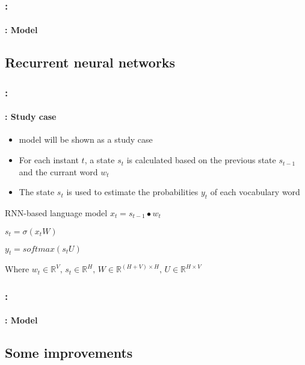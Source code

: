 \documentclass[xcolor=table]{beamer}
\begin{document}
\begin{frame}
	\frametitle{\insertshortsubtitle: \insertsection}
	\framesubtitle{\insertsubsection: Model}
	
	\vspace{-6pt}
	\begin{center}
	\end{center}

\end{frame}

\subsection{Recurrent neural networks}

\begin{frame}
	\frametitle{\insertshortsubtitle: \insertsection}
	\framesubtitle{\insertsubsection: Study case}

	\begin{itemize}
		\item \cite{2010-mokolov-al} model will be shown as a study case
		\item For each instant $t$, a state $s_t$ is calculated based on the previous state $s_{t-1}$ and the currant word $w_t$
		\item The state $s_t$ is used to estimate the probabilities $y_t$ of each vocabulary word
	\end{itemize}
	
	\begin{block}{RNN-based language model}
		$x_t = s_{t-1} \bullet w_t$
		
		$s_t = \sigma(x_t W)$
		
		$y_t = softmax(s_t U)$
		
		Where $w_t \in \mathbb{R}^{V},\, s_t \in \mathbb{R}^{H},\, W \in \mathbb{R}^{(H+V)\times H},\, U \in \mathbb{R}^{H\times V}$
	\end{block}

\end{frame}

\begin{frame}
	\frametitle{\insertshortsubtitle: \insertsection}
	\framesubtitle{\insertsubsection: Model}

	\begin{center}
	\end{center}

\end{frame}

\subsection{Some improvements}
\end{document}
